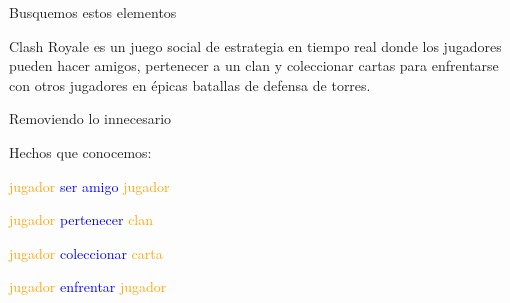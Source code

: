 \begin{frame}{Busquemos estos elementos}
    \begin{overlayarea}{\linewidth}{\textheight}
        \vspace{20mm}
        \begin{block}{}
            Clash Royale es un juego social de estrategia en tiempo real
            donde los { jugadores} pueden {\color<5->{blue} hacer amigos},
            {pertenecer} a un {clan} 
            y { coleccionar} { cartas} para
            { enfrentarse} con otros jugadores en
            \'epicas batallas de defensa de torres.
        \end{block}

        \vspace{5mm}

        \centering
    \end{overlayarea}
    
\end{frame}


\begin{frame}{Removiendo lo innecesario}
    \begin{center}
        \Large Hechos que conocemos:
        \vspace{5mm}
        
        \textcolor{orange}{jugador} \hspace{10mm} \textcolor{blue}{ser amigo} \hspace{10mm} \textcolor{orange}{jugador}
        \vspace{5mm}

        \textcolor{orange}{jugador} \hspace{10mm} \textcolor{blue}{pertenecer} \hspace{10mm} \textcolor{orange}{clan}
        \vspace{5mm}

        \textcolor{orange}{jugador} \hspace{10mm} \textcolor{blue}{coleccionar} \hspace{10mm} \textcolor{orange}{carta}
        \vspace{5mm}

        \textcolor{orange}{jugador} \hspace{10mm} \textcolor{blue}{enfrentar} \hspace{10mm} \textcolor{orange}{jugador}
    \end{center}
\end{frame}
